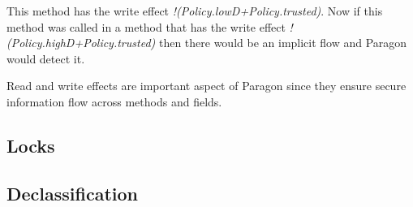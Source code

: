This method has the write effect \emph{!(Policy.lowD+Policy.trusted)}. Now if this method was called in a method that has the write effect \emph{!(Policy.highD+Policy.trusted)} then there would be an implicit flow and Paragon would detect it.

Read and write effects are important aspect of Paragon since they ensure secure information flow across methods and fields.

\subsection{Locks}



\subsection{Declassification}

